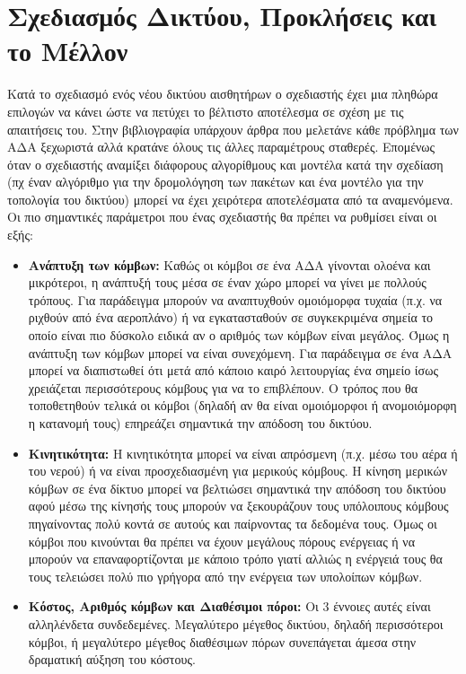 \section{Σχεδιασμός Δικτύου, Προκλήσεις και το Μέλλον}\label{sc:wsn_design}
Κατά το σχεδιασμό ενός νέου δικτύου αισθητήρων ο σχεδιαστής έχει μια πληθώρα επιλογών να κάνει ώστε να πετύχει το βέλτιστο αποτέλεσμα σε σχέση με τις απαιτήσεις
του.
Στην βιβλιογραφία υπάρχουν άρθρα που μελετάνε κάθε πρόβλημα των ΑΔΑ ξεχωριστά αλλά κρατάνε όλους τις άλλες παραμέτρους σταθερές.
Επομένως όταν ο σχεδιαστής αναμίξει διάφορους αλγορίθμους και μοντέλα κατά την σχεδίαση (πχ έναν αλγόριθμο για την δρομολόγηση των πακέτων και ένα μοντέλο για την
τοπολογία του δικτύου) μπορεί να έχει χειρότερα αποτελέσματα από τα αναμενόμενα.
Οι πιο σημαντικές παράμετροι που ένας σχεδιαστής θα πρέπει να ρυθμίσει είναι οι εξής:
\begin{itemize}
\item \textbf{Ανάπτυξη των κόμβων:} Καθώς οι κόμβοι σε ένα ΑΔΑ γίνονται ολοένα και μικρότεροι, η ανάπτυξή τους μέσα σε έναν χώρο μπορεί να γίνει με πολλούς τρόπους.
Για παράδειγμα μπορούν να αναπτυχθούν ομοιόμορφα τυχαία (π.χ. να ριχθούν από ένα αεροπλάνο) ή να εγκατασταθούν σε συγκεκριμένα σημεία το οποίο είναι πιο
δύσκολο ειδικά αν ο αριθμός των κόμβων είναι μεγάλος.
Όμως η ανάπτυξη των κόμβων μπορεί να είναι συνεχόμενη.
Για παράδειγμα σε ένα ΑΔΑ μπορεί να διαπιστωθεί ότι μετά από κάποιο καιρό λειτουργίας ένα σημείο ίσως χρειάζεται περισσότερους κόμβους για να το επιβλέπουν.
Ο τρόπος που θα τοποθετηθούν τελικά οι κόμβοι (δηλαδή αν θα είναι ομοιόμορφοι ή ανομοιόμορφη η κατανομή τους) επηρεάζει σημαντικά την απόδοση του δικτύου.
\item \textbf{Κινητικότητα:} Η κινητικότητα μπορεί να είναι απρόσμενη (π.χ. μέσω του αέρα ή του νερού) ή να είναι προσχεδιασμένη για μερικούς κόμβους.
Η κίνηση μερικών κόμβων σε ένα δίκτυο μπορεί να βελτιώσει σημαντικά την απόδοση του δικτύου αφού μέσω της κίνησής τους μπορούν να ξεκουράζουν τους υπόλοιπους κόμβους
πηγαίνοντας πολύ κοντά σε αυτούς και παίρνοντας τα δεδομένα τους.
Όμως οι κόμβοι που κινούνται θα πρέπει να έχουν μεγάλους πόρους ενέργειας ή να μπορούν να επαναφορτίζονται με κάποιο τρόπο γιατί αλλιώς η ενέργειά τους θα τους
τελειώσει πολύ πιο γρήγορα από την ενέργεια των υπολοίπων κόμβων.
\item \textbf{Κόστος, Αριθμός κόμβων και Διαθέσιμοι πόροι:} Οι 3 έννοιες αυτές είναι αλληλένδετα συνδεδεμένες.
Μεγαλύτερο μέγεθος δικτύου, δηλαδή περισσότεροι κόμβοι, ή μεγαλύτερο μέγεθος διαθέσιμων πόρων συνεπάγεται άμεσα στην δραματική αύξηση του κόστους.

\end{itemize}
